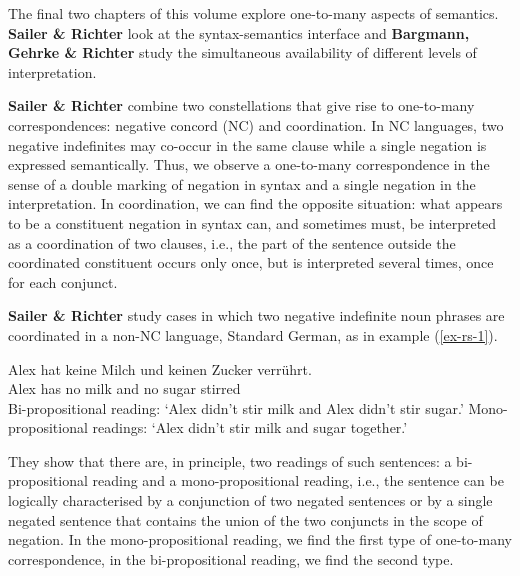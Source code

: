 \documentclass[output=paper]{langscibook}
\begin{document}
\medskip

\begin{sloppypar}
  The final two chapters of this volume explore one-to-many aspects of
  semantics.  \textbf{Sailer \& Richter} look at the syntax-semantics
  interface and \textbf{Barg\-mann, Gehr\-ke \& Rich\-ter} study the
  simultaneous availability of different levels of interpretation.
\end{sloppypar}

\medskip
\textbf{Sailer \& Richter} combine two constellations that give rise
to one-to-many correspondences: negative concord (NC) and
coordination.  In NC languages, two negative indefinites may co-occur
in the same clause while a single negation is expressed
semantically. Thus, we observe a one-to-many correspondence in
the sense of a double marking of negation in syntax and a single
negation in the interpretation.  In coordination, we can find the
opposite situation: what appears to be a constituent negation in
syntax can, and sometimes must, be interpreted as a coordination of
two clauses, i.e., the part of the sentence outside the coordinated
constituent occurs only once, but is interpreted several times, once
for each conjunct.

\textbf{Sailer \& Richter} study cases in which two negative indefinite noun phrases are coordinated in a non-NC language, Standard German, as in example (\ref{ex-rs-1}). 

\ea \label{ex-rs-1} 
\gll Alex hat keine Milch und keinen Zucker verrührt.\\
Alex has no milk and no sugar stirred\\
\glt Bi-propositional reading: `Alex didn't stir milk and Alex didn't stir sugar.'
\glt Mono-propositional readings: `Alex didn't stir milk and sugar together.'
\z 

They show that there are, in principle, two readings of such
sentences: a bi-propositional reading and a mono-propositional
reading, i.e., the sentence can be logically characterised by a conjunction of two
negated sentences or by a single negated sentence that contains the
union of the two conjuncts in the scope of negation.  In the
mono-propositional reading, we find the first type of one-to-many
correspondence, in the bi-propositional reading, we find the second
type.
\end{document}
